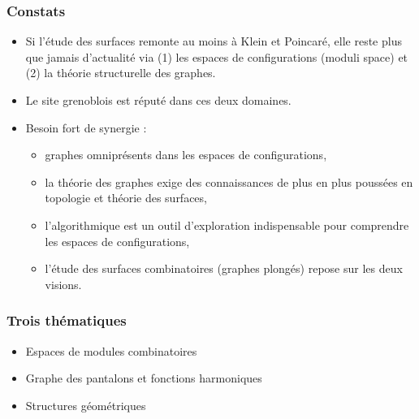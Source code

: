 \documentclass[a4paper,compress]{beamer}  %
\theoremstyle{definition}
\begin{document}
\begin{frame}
  \frametitle{Constats}

\vspace{.5cm}
\begin{itemize}
\item Si l'étude des surfaces remonte au moins à Klein et Poincaré, elle reste plus que jamais d'actualité via (1) les espaces de configurations (moduli space) et (2) la théorie structurelle des graphes.
\item Le site grenoblois est réputé dans ces deux  domaines.
\item Besoin fort de synergie :
  \begin{itemize}
  \item graphes  omniprésents dans les espaces de configurations,
  \item la théorie des graphes exige des connaissances de plus en plus poussées en topologie et théorie des surfaces,
  \item l'algorithmique est un outil d'exploration indispensable pour comprendre les  espaces de configurations,
    \item l'étude des surfaces combinatoires (graphes plongés) repose sur les deux visions.
  \end{itemize}
  
\end{itemize}
\end{frame}
\begin{frame}
  \frametitle{Trois thématiques}
\Large
  \begin{itemize}
  \item Espaces de modules combinatoires
\item Graphe des pantalons et fonctions harmoniques
\item Structures géométriques
  \end{itemize}
\end{frame}
\end{document}
